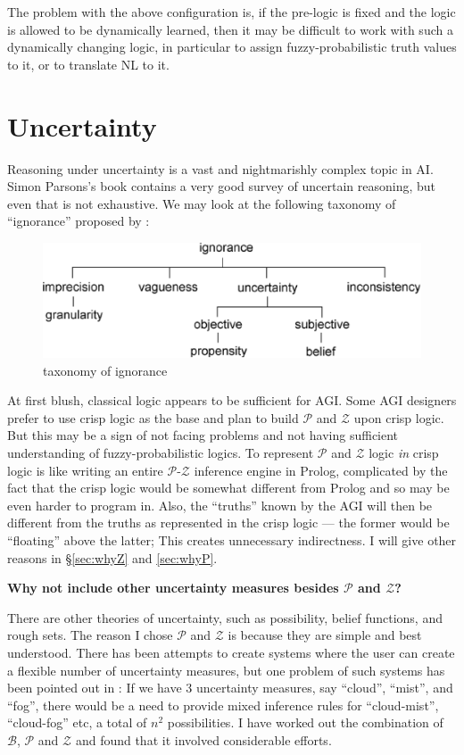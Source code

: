 The problem with the above configuration is, if the pre-logic is fixed and the logic is allowed to be dynamically learned, then it may be difficult to work with such a dynamically changing logic, in particular to assign fuzzy-probabilistic truth values to it, or to translate NL to it.



\section{Uncertainty}

Reasoning under uncertainty is a vast and nightmarishly complex topic in AI.  Simon Parsons's book \citep*{Parsons2001} contains a very good survey of uncertain reasoning, but even that is not exhaustive.  We may look at the following taxonomy of ``ignorance'' proposed by \citep*{Bosc1997}:
\begin{figure}[H]
\centering
\includegraphics[scale=0.7]{IgnoranceTaxonomy.eps}
\caption{taxonomy of ignorance}
\end{figure}

At first blush, classical logic appears to be sufficient for AGI.  Some AGI designers prefer to use crisp logic as the base and plan to build $\mathcal{P}$ and $\mathcal{Z}$ upon crisp logic.  But this may be a sign of not facing problems and not having sufficient understanding of fuzzy-probabilistic logics.  To represent $\mathcal{P}$ and $\mathcal{Z}$ logic \textit{in} crisp logic is like writing an entire $\mathcal{P}$-$\mathcal{Z}$ inference engine in Prolog, complicated by the fact that the crisp logic would be somewhat different from Prolog and so may be even harder to program in.  Also, the ``truths'' known by the AGI will then be different from the truths as represented in the crisp logic --- the former would be ``floating'' above the latter;  This creates unnecessary indirectness.  I will give other reasons in \S\ref{sec:whyZ} and \ref{sec:whyP}.

\textbf{Why not include other uncertainty measures besides $\mathcal{P}$ and $\mathcal{Z}$?}

There are other theories of uncertainty, such as possibility, belief functions, and rough sets.  The reason I chose $\mathcal{P}$ and $\mathcal{Z}$ is because they are simple and best understood.  There has been attempts to create systems where the user can create a flexible number of uncertainty measures, but one problem of such systems has been pointed out in \citep*{Parsons2001}:  If we have 3 uncertainty measures, say ``cloud'', ``mist'', and ``fog'', there would be a need to provide mixed inference rules for ``cloud-mist'', ``cloud-fog'' etc, a total of $n^2$ possibilities.  I have worked out the combination of $\mathcal{B}$, $\mathcal{P}$ and $\mathcal{Z}$ and found that it involved considerable efforts.


